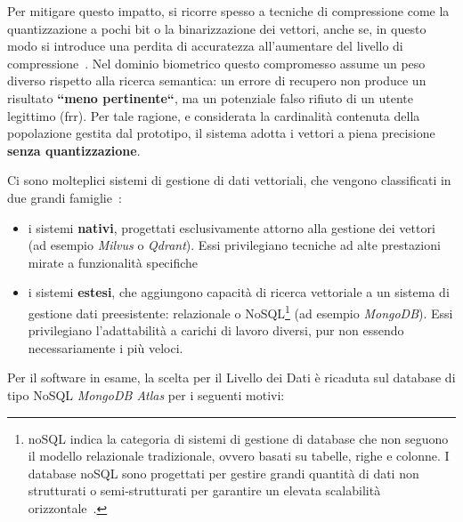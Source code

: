 Per mitigare questo impatto, si ricorre spesso a tecniche di compressione come la quantizzazione a pochi bit o la binarizzazione dei vettori, anche se, in questo modo si introduce una perdita di accuratezza all'aumentare del livello di compressione~\cite{abtahiHNSWInformationTheoreticBinarization2025}.
Nel dominio biometrico questo compromesso assume un peso diverso rispetto alla ricerca semantica: un errore di recupero non produce un risultato \textbf{``meno pertinente``}, ma un potenziale falso rifiuto di un utente legittimo (\gls{frr}). 
Per tale ragione, e considerata la cardinalità contenuta della popolazione gestita dal prototipo, il sistema adotta i vettori a piena precisione \textbf{senza quantizzazione}.

Ci sono molteplici sistemi di gestione di dati vettoriali, che vengono classificati in due grandi famiglie~\cite{panSurveyVectorDatabase2023}: 
\begin{itemize}
    \item i sistemi \textbf{nativi}, progettati esclusivamente attorno alla gestione dei vettori (ad esempio \textit{Milvus} o \textit{Qdrant}). Essi privilegiano tecniche ad alte prestazioni mirate a funzionalità specifiche
    \item i sistemi \textbf{estesi}, che aggiungono capacità di ricerca vettoriale a un sistema di gestione dati preesistente: relazionale o NoSQL\footnote{\gls{noSQL} indica la categoria di sistemi di gestione di database che non seguono il modello relazionale tradizionale, ovvero basati su tabelle, righe e colonne. I database \gls{noSQL} sono progettati per gestire grandi quantità di dati non strutturati o semi-strutturati per garantire un elevata scalabilità orizzontale~\cite{mongoNoSQL}.} (ad esempio \textit{MongoDB}).
    Essi privilegiano l'adattabilità a carichi di lavoro diversi, pur non essendo necessariamente i più veloci.
\end{itemize}
Per il software in esame, la scelta per il Livello dei Dati è ricaduta sul database di tipo NoSQL \textit{MongoDB Atlas} per i seguenti motivi:
